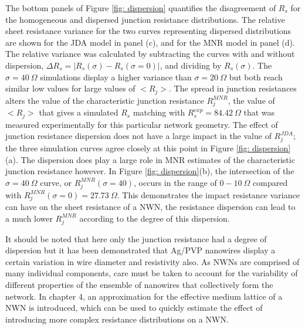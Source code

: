 The bottom panels of Figure \ref{fig: dispersion} quantifies the disagreement of $R_s$ for the homogeneous and dispersed junction resistance distributions. The relative sheet resistance variance for the two curves representing dispersed distributions are shown for the JDA model in panel (c), and for the MNR model in panel (d). The relative variance was calculated by subtracting the curves with and without dispersion, $\Delta R_s = |R_s(\sigma) - R_s(\sigma = 0)|$, and dividing by $R_s(\sigma)$. The $\sigma = 40 ~\Omega$ simulations display a higher variance than $\sigma = 20 ~ \Omega$ but both reach similar low values for large values of $<R_j>$. The spread in junction resistances alters the value of the characteristic junction resistance $R_j^{MNR}$, the value of $<R_j>$ that gives a simulated $R_s$ matching with $R_s^{exp} = 84.42 ~ \Omega$ that was measured experimentally for this particular network geometry\cite{rocha2015}. The effect of junction resistance dispersion does not have a large impact in the value of $R_j^{JDA}$; the three simulation curves agree closely at this point in Figure \ref{fig: dispersion}(a). The dispersion does play a large role in MNR estimates of the characteristic junction resistance however. In Figure \ref{fig: dispersion}(b), the intersection of the $\sigma = 40 ~ \Omega$ curve, or $R_j^{MNR}(\sigma = 40)$,  occurs in the range of $0-10~\Omega$ compared with $R_j^{MNR}(\sigma = 0) = 27.73 ~\Omega$. This demonstrates the impact resistance variance can have on the sheet resistance of a NWN, the resistance dispersion can lead to a much lower $R_j^{MNR}$ according to the degree of this dispersion.

It should be noted that here only the junction resistance had a degree of dispersion but it has been demonstrated that Ag/PVP nanowires display a certain variation in wire diameter and resistivity also\cite{rocha2015}. As NWNs are comprised of many individual components, care must be taken to account for the variability of different properties of the ensemble of nanowires that collectively form the network. In chapter 4, an approximation for the effective medium lattice of a NWN is introduced, which can be used to quickly estimate the effect of introducing more complex resistance distributions on a NWN.

